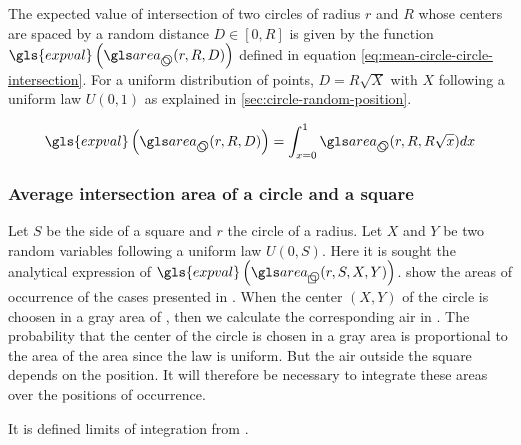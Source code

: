 \begin{appendix}
The expected value of intersection of two circles of radius \( r \) and \( R \) whose centers are spaced by a random distance \( D \in [0, R] \) is given by the function \( \gls{expval} \left( \circir (r, R, D) \right) \) defined in equation \eqref{eq:mean-circle-circle-intersection}.
For a uniform distribution of points, \( \textstyle D = R \sqrt{X} \) with \( X \) following a uniform law \( U(0, 1) \) as explained in \ref{sec:circle-random-position}.

\begin{equation}\label{eq:mean-circle-circle-intersection}
  \gls{expval} \left( \circir(r, R, D) \right) =
    \int_{x=0}^1 \circir (r, R, R \sqrt{x}) dx
\end{equation}


\subsubsection{Average intersection area of a circle and a square}

Let \( S \) be the side of a square and \( r \) the circle of a radius.
Let \( X \) and \( Y \) be two random variables following a uniform law \( U(0, S) \).
Here it is sought the analytical expression of \( \gls{expval} \left( \cirsqr (r, S, X, Y) \right) \).
 show the areas of occurrence of the cases presented in .
When the center \( ( X, Y ) \) of the circle is choosen in a gray area of , then we calculate the corresponding air in .
The probability that the center of the circle is chosen in a gray area is proportional to the area of the area since the law is uniform.
But the air outside the square depends on the position.
It will therefore be necessary to integrate these areas over the positions of occurrence.


\medskip

It is defined limits of integration from .


\end{appendix}
